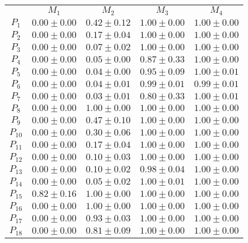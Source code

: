 \documentclass[anon]{CI}
\begin{document}
		\begin{table}[H]
			\centering
			\def\arraystretch{1.5}
			\footnotesize
			\begin{tabular}{ccccc}
				
				& $M_{1}$  & $M_{2}$  & $M_{3}$  & $M_{4}$ \\ \cline{2-5}
				$P_{1}$  & $0.00\pm0.00$  & $0.42\pm0.12$  & $1.00\pm0.00$  & $1.00\pm0.00$ \\
				$P_{2}$  & $0.00\pm0.00$  & $0.17\pm0.04$  & $1.00\pm0.00$  & $1.00\pm0.00$ \\
				$P_{3}$  & $0.00\pm0.00$  & $0.07\pm0.02$  & $1.00\pm0.00$  & $1.00\pm0.00$ \\
				$P_{4}$  & $0.00\pm0.00$  & $0.05\pm0.00$  & $0.87\pm0.33$  & $1.00\pm0.00$ \\
				$P_{5}$  & $0.00\pm0.00$  & $0.04\pm0.00$  & $0.95\pm0.09$  & $1.00\pm0.01$ \\
				$P_{6}$  & $0.00\pm0.00$  & $0.04\pm0.01$  & $0.99\pm0.01$  & $0.99\pm0.01$ \\
				$P_{7}$  & $0.00\pm0.00$  & $0.03\pm0.01$  & $0.80\pm0.33$  & $1.00\pm0.01$ \\
				$P_{8}$  & $0.00\pm0.00$  & $1.00\pm0.00$  & $1.00\pm0.00$  & $1.00\pm0.00$ \\
				$P_{9}$  & $0.00\pm0.00$  & $0.47\pm0.10$  & $1.00\pm0.00$  & $1.00\pm0.00$ \\
				$P_{10}$  & $0.00\pm0.00$  & $0.30\pm0.06$  & $1.00\pm0.00$  & $1.00\pm0.00$ \\
				$P_{11}$  & $0.00\pm0.00$  & $0.17\pm0.04$  & $1.00\pm0.00$  & $1.00\pm0.00$ \\
				$P_{12}$  & $0.00\pm0.00$  & $0.10\pm0.03$  & $1.00\pm0.00$  & $1.00\pm0.00$ \\
				$P_{13}$  & $0.00\pm0.00$  & $0.10\pm0.02$  & $0.98\pm0.04$  & $1.00\pm0.00$ \\
				$P_{14}$  & $0.00\pm0.00$  & $0.05\pm0.02$  & $1.00\pm0.01$  & $1.00\pm0.00$ \\
				$P_{15}$  & $0.82\pm0.16$  & $1.00\pm0.00$  & $1.00\pm0.00$  & $1.00\pm0.00$ \\
				$P_{16}$  & $0.00\pm0.00$  & $1.00\pm0.00$  & $1.00\pm0.00$  & $1.00\pm0.00$ \\
				$P_{17}$  & $0.00\pm0.00$  & $0.93\pm0.03$  & $1.00\pm0.00$  & $1.00\pm0.00$ \\
				$P_{18}$  & $0.00\pm0.00$  & $0.81\pm0.09$  & $1.00\pm0.00$  & $1.00\pm0.00$ \\

\end{tabular}
\end{table}
\end{document}
